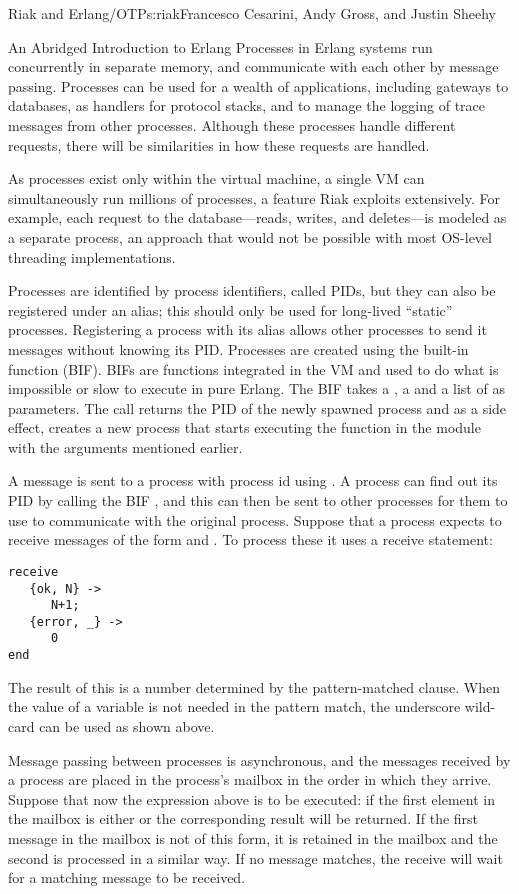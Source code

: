 \begin{aosachapter}{Riak and Erlang/OTP}{s:riak}{Francesco Cesarini, Andy Gross, and Justin Sheehy}
\begin{aosasect1}{An Abridged Introduction to Erlang}
Processes in Erlang systems run concurrently in separate memory, and
communicate with each other by message passing. Processes can be used
for a wealth of applications, including gateways to databases, as
handlers for protocol stacks, and to manage the logging of trace
messages from other processes. Although these processes handle
different requests, there will be similarities in how these requests
are handled.

As processes exist only within the virtual machine, a single VM can
simultaneously run millions of processes, a feature Riak exploits
extensively. For example, each request to the database---reads, writes, and
deletes---is modeled as a separate process, an approach that would
not be possible with most OS-level threading implementations.

Processes are identified by process identifiers, called PIDs, but
they can also be registered under an alias; this should only be used
for long-lived ``static'' processes. Registering a process with its
alias allows other processes to send it messages without knowing its
PID. Processes are created using the  built-in function (BIF). BIFs are functions integrated
in the VM and used to do what is impossible or slow to execute in pure
Erlang. The  BIF takes a , a
 and a list of  as parameters. The call
returns the PID of the newly spawned process and as a side effect,
creates a new process that starts executing the function in the module
with the arguments mentioned earlier.

A message  is sent to a process with process id 
using . A process can find out its PID by calling the
BIF , and this can then be sent to other processes for them
to use to communicate with the original process. Suppose that a
process expects to receive messages of the form  and
. To process these it uses a receive
statement:

\begin{verbatim}
receive
   {ok, N} ->
      N+1;
   {error, _} ->
      0
end
\end{verbatim}

\noindent The result of this is a number determined by the pattern-matched
clause. When the value of a variable is not needed in the pattern
match, the underscore wild-card can be used as shown above.

Message passing between processes is asynchronous, and the messages
received by a process are placed in the process's mailbox in the order
in which they arrive. Suppose that now the  expression
above is to be executed: if the first element in the mailbox is either
 or  the corresponding result
will be returned. If the first message in the mailbox is not of this
form, it is retained in the mailbox and the second is processed in a
similar way. If no message matches, the receive will wait for a
matching message to be received.


\end{aosasect1}
\end{aosachapter}
